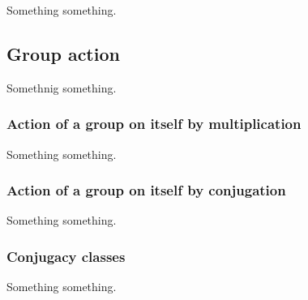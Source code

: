 Something something.

\subsection{Group action}

Somethnig something.

\subsubsection{Action of a group on itself by multiplication}

Something something.

\subsubsection{Action of a group on itself by conjugation}

Something something.

\subsubsection{Conjugacy classes}

Something something.

